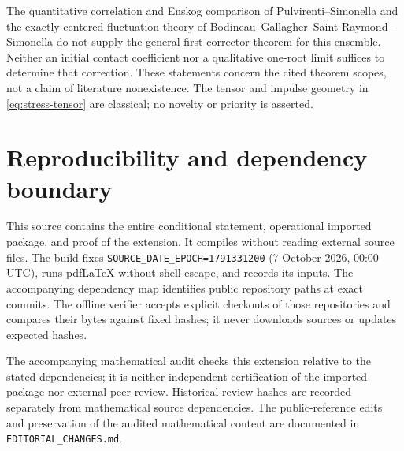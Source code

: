\documentclass[11pt,letterpaper]{article}
\numberwithin{equation}{section}
\theoremstyle{definition}\newtheorem{assumption}[theorem]{Assumption}
\theoremstyle{remark}\newtheorem{remark}[theorem]{Remark}
\begin{document}
The quantitative correlation and Enskog comparison of Pulvirenti--Simonella \cite{PS} and the exactly centered fluctuation theory of Bodineau--Gallagher--Saint-Raymond--Simonella \cite{BGSS} do not supply the general first-corrector theorem for this ensemble. Neither an initial contact coefficient nor a qualitative one-root limit suffices to determine that correction. These statements concern the cited theorem scopes, not a claim of literature nonexistence. The tensor and impulse geometry in \eqref{eq:stress-tensor} are classical; no novelty or priority is asserted.

\appendix
\section{Reproducibility and dependency boundary}
This source contains the entire conditional statement, operational imported package, and proof of the extension. It compiles without reading external source files. The build fixes \texttt{SOURCE\_DATE\_EPOCH=1791331200} (7 October 2026, 00:00 UTC), runs pdf\LaTeX{} without shell escape, and records its inputs. The accompanying dependency map identifies public repository paths at exact commits. The offline verifier accepts explicit checkouts of those repositories and compares their bytes against fixed hashes; it never downloads sources or updates expected hashes.

The accompanying mathematical audit checks this extension relative to the stated dependencies; it is neither independent certification of the imported package nor external peer review. Historical review hashes are recorded separately from mathematical source dependencies. The public-reference edits and preservation of the audited mathematical content are documented in \texttt{EDITORIAL\_CHANGES.md}.
\end{document}
